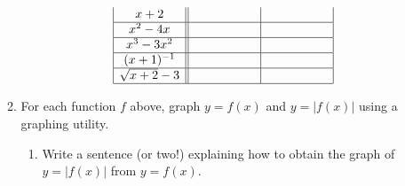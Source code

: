 \documentclass{ximera}
\begin{document}
\begin{enumerate}
\begin{enumerate}
\[\begin{array}{|c||c|c|}
x+2 &      \hphantom{\sqrt{x+3}-2}   &         \hphantom{\sqrt{x+3}-2}      \\ \hline

x^2-4x &      \hphantom{\sqrt{x+3}-2}      &      \hphantom{\sqrt{x+3}-2}       \\  \hline

x^3-3x^2 &     \hphantom{\sqrt{x+3}-2}       &    \hphantom{\sqrt{x+3}-2}       \\  \hline  

(x+1)^{-1}  &      \hphantom{\sqrt{x+3}-2}      &    \hphantom{\sqrt{x+3}-2}       \\  \hline   

\sqrt{x+2}-3&    \hphantom{\sqrt{x+3}-2}        &     \hphantom{\sqrt{x+3}-2}      \\  \hline   

 \end{array} \]
 











\item For each function $f$ above, graph $y = f(x)$ and $y=|f(x)|$ using a graphing utility.

\begin{enumerate}

\item Write a sentence (or two!) explaining how to obtain the graph of $y=|f(x)|$ from $y = f(x)$.  


\end{enumerate}
\end{enumerate}
\end{enumerate}
\end{document}
